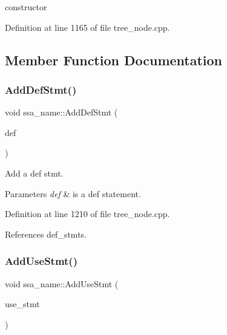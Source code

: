 constructor 



Definition at line 1165 of file tree\+\_\+node.\+cpp.



\subsection{Member Function Documentation}
\mbox{\label{structssa__name_a1f3d0e202b839a3e0646b808ebd06d13}} 
\subsubsection{\texorpdfstring{Add\+Def\+Stmt()}{AddDefStmt()}}
{\footnotesize\ttfamily void ssa\+\_\+name\+::\+Add\+Def\+Stmt (\begin{DoxyParamCaption}\item[{const \hyperlink{tree__node_8hpp_a6ee377554d1c4871ad66a337eaa67fd5}{tree\+\_\+node\+Ref} \&}]{def }\end{DoxyParamCaption})}



Add a def stmt. 


\begin{DoxyParams}{Parameters}
{\em def} & is a def statement. \\
\hline
\end{DoxyParams}


Definition at line 1210 of file tree\+\_\+node.\+cpp.



References def\+\_\+stmts.

\mbox{\label{structssa__name_a69e17d397eba584f53986d9930ca299d}} 
\subsubsection{\texorpdfstring{Add\+Use\+Stmt()}{AddUseStmt()}}
{\footnotesize\ttfamily void ssa\+\_\+name\+::\+Add\+Use\+Stmt (\begin{DoxyParamCaption}\item[{const \hyperlink{tree__node_8hpp_a6ee377554d1c4871ad66a337eaa67fd5}{tree\+\_\+node\+Ref} \&}]{use\+\_\+stmt }\end{DoxyParamCaption})}



